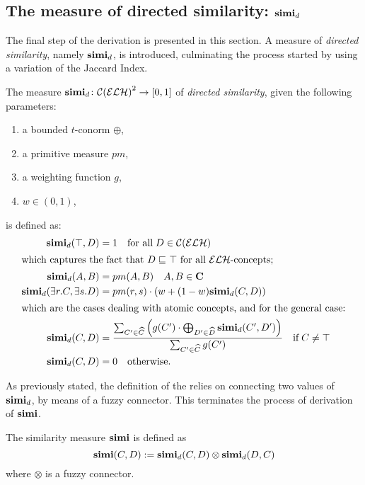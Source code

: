 \subsection{The measure of directed similarity: \(\simi_d\)}

The final step of the derivation is presented in this section. A measure of \emph{directed similarity}, namely \(\simi_d\), is introduced, culminating the process started by using a variation of the Jaccard Index.

  \begin{definition}[\(\simi_d\)]\label{simi-d}
    The measure \(\mathbf{simi}_d \colon {\mathcal{C}(\mathcal{ELH})}^2 \to [0,1]\) of \emph{directed similarity}, given the following parameters:
    \begin{enumerate}
      \item a bounded \(t\)-conorm \(\oplus\),
      \item a primitive measure \(pm\),
      \item a weighting function \(g\),
      \item \(w \in (0,1)\),
    \end{enumerate}
    is defined as:
    \begin{align}
      \simi_d(\top,D) &= 1 \quad
      \text{for all}\; D \in \mathcal{C}(\mathcal{ELH}) \\
      \intertext{which captures the fact that \(D \subsume{} \top\) for all \elh-concepts;}
      \simi_d(A,B) &= pm(A,B) \quad A,B \in \Conc \\
      \simi_d(\exists{}r.C,\exists{}s.D) &=
      pm(r,s) \cdot \left(w + (1-w)\simi_d(C,D)\right) \\
      \intertext{which are the cases dealing with atomic concepts, and for the general case:}
      \simi_d(C,D) &=
      \frac{\sum_{C^\prime \in \widehat{C}}\left(g(C^\prime) \cdot \bigoplus_{D^\prime \in \widehat{D}} \simi_d(C^\prime, D^\prime)\right)}%
      {\sum_{C^\prime \in \widehat{C}}g(C^\prime)} \quad \text{if}\; C \ne \top \label{simi:general}\\
      \simi_d(C,D) &= 0 \quad \text{otherwise}.
    \end{align}
  \end{definition}

  As previously stated, the definition of the \csm \simi relies on connecting two values of \(\simi_d\), by means of a fuzzy connector. This terminates the process of derivation of \(\simi\).

  \begin{definition}[\(\simi\)]
    The similarity measure \(\simi\) is defined as \begin{equation}
      \mathbf{simi}(C,D) := \mathbf{simi}_d(C,D) \otimes \mathbf{simi}_d(D,C)
    \end{equation}
    where \(\otimes{}\) is a fuzzy connector.
  \end{definition}

